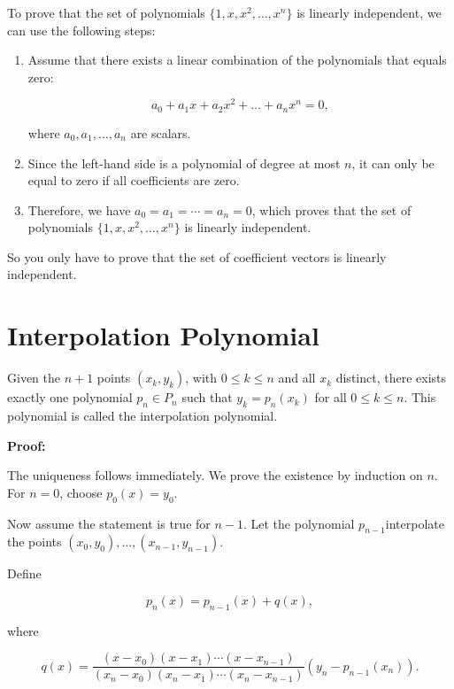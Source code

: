 To prove that the set of polynomials \(\{1, x, x^2, \ldots, x^n\}\) is linearly independent,
we can use the following steps:

\begin{enumerate}

	\item Assume that there exists a linear combination of the polynomials that equals zero:

	      \[
		      a_0 + a_1 x + a_2 x^2 + \ldots + a_n x^n = 0,
	      \]

	      where \(a_0, a_1, \ldots, a_n\) are scalars.

	\item Since the left-hand side is a polynomial of degree at most \(n\), it can only be equal
	      to zero if all coefficients are zero.

	\item Therefore, we have \(a_0 = a_1 = \cdots = a_n = 0\), which proves that the set of polynomials \(\{1, x, x^2, \ldots, x^n\}\)
	      is linearly independent.

\end{enumerate}

So you only have to prove that the set of coefficient vectors is linearly independent.

\section{Interpolation Polynomial}

Given the \(n+1\) points \((x_k, y_k)\), with \(0 \leq k \leq n\) and all \(x_k\) distinct, there exists exactly one polynomial \(p_n \in P_n\) such
that \(y_k = p_n(x_k)\) for all \(0 \leq k \leq n\). This polynomial is called the interpolation polynomial.

\textbf{Proof:}

The uniqueness follows immediately. We prove the existence by induction on \(n\). For \(n = 0\), choose \(p_0(x) = y_0\).

Now assume the statement is true for \(n-1\). Let the polynomial \(p_{n-1}\)interpolate the points \((x_0, y_0), \ldots, (x_{n-1}, y_{n-1})\).

Define

\[
	p_n(x) = p_{n-1}(x) + q(x),
\]

where

\[
	q(x) = \frac{(x - x_0)(x - x_1)\cdots(x - x_{n-1})}{(x_n - x_0)(x_n - x_1)\cdots(x_n - x_{n-1})}
	(y_n - p_{n-1}(x_n)).
\]

